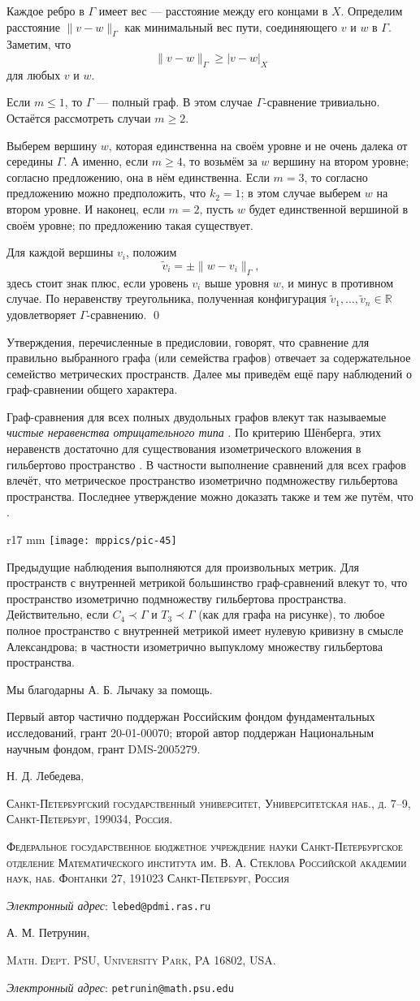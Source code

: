\documentclass{article}
\makeatletter
\newcommand{\Addresses}{{\bigskip\footnotesize

\noindent Н. Д. Лебедева,
\par\nopagebreak
 \textsc{Санкт-Петербургский государственный университет, Университетская наб., д. 7–9, Санкт-Петербург, 199034, Россия.}
\par
\nopagebreak
 \textsc{Федеральное  государственное  бюджетное  учреждение  науки
Санкт-Петербургское  отделение  Математического  института
им. В. А. Стеклова  Российской  академии  наук, наб. Фонтанки 27,
191023 Санкт-Петербург,
Россия }
  \par\nopagebreak
  \textit{Электронный адрес}: \texttt{lebed@pdmi.ras.ru}

\medskip

\noindent   А. М. Петрунин, 
\par\nopagebreak
 \textsc{Math. Dept. PSU, University Park, PA 16802, USA.}
  \par\nopagebreak
  \textit{Электронный адрес}: \texttt{petrunin@math.psu.edu}
  
}}
\def\parbf#1{\medskip\noindent{\bf #1}}
\def\qeds{\qed\par\medskip}
\makeatother
\begin{document}
Каждое ребро в $\Gamma$ имеет вес --- расстояние между его концами в $X$.
Определим расстояние $\|v-w\|_\Gamma$ как минимальный вес пути, соединяющего $v$ и $w$ в $\Gamma$.
Заметим, что 
\[\|v-w\|_\Gamma\geqslant |v-w|_X\]
для любых $v$ и $w$.

Если $m\leqslant 1$, то $\Gamma$ --- полный граф.
В этом случае $\Gamma$-сравнение тривиально.
Остаётся рассмотреть случаи $m\geqslant2$.

Выберем вершину $w$, которая единственна на своём уровне и не очень далека от середины $\Gamma$.
А именно, если $m\geqslant 4$, то возьмём за $w$ вершину на втором уровне; 
согласно предложению, она в нём единственна.
Если $m=3$, то согласно предложению можно предположить, что $k_2=1$;
в этом случае выберем $w$ на втором уровне.
И наконец, если $m=2$, пусть $w$ будет единственной вершиной в своём уровне;
по предложению такая существует.

Для каждой вершины $v_i$, положим
\[\tilde v_i=\pm \|w-v_i\|_\Gamma,\]
здесь стоит знак плюс, если уровень $v_i$ выше уровня $w$, и минус в противном случае.
По неравенству треугольника, полученная конфигурация $\tilde v_1,\dots,\tilde v_n\in\mathbb{R}$ удовлетворяет $\Gamma$-сравнению.
\qeds

\parbf{Замечания.}
Утверждения, перечисленные в предисловии, говорят, что сравнение для правильно выбранного графа (или семейства графов) отвечает за содержательное семейство метрических пространств.
Далее мы приведём ещё пару наблюдений о граф-сравнении общего характера.

Граф-сравнения для всех полных двудольных графов влекут так называемые \emph{чистые неравенства отрицательного типа} \cite[6.1.1]{deza-laurent-ru}.
По критерию Шёнберга, этих неравенств достаточно для существования изометрического вложения в гильбертово пространство \cite[6.2.1]{deza-laurent-ru}.
В частности выполнение сравнений для всех графов влечёт, что метрическое пространство изометрично подмножеству гильбертова пространства.
Последнее утверждение можно доказать также и тем же путём, что \cite[Prop. 1.9]{toyoda}.


\begin{wrapfigure}{r}{17 mm}
\vskip-6mm
\centering
\texttt{[image: mppics/pic-45]}
\vskip-2mm
\end{wrapfigure}

Предыдущие наблюдения выполняются для произвольных метрик.
Для пространств с внутренней метрикой большинство граф-сравнений влекут то, что пространство изометрично подмножеству гильбертова пространства.
Действительно, если $C_4\prec\Gamma$ и $T_3\prec\Gamma$ (как для графа на рисунке),
то любое полное пространство с внутренней метрикой имеет нулевую кривизну в смысле Александрова; 
в частности изометрично выпуклому множеству гильбертова пространства.

\parbf{Благодарности.}
Мы благодарны А. Б. Лычаку за помощь. 

Первый автор частично поддержан Российским фондом фундаментальных исследований, грант 20-01-00070;
второй автор поддержан Национальным научным фондом, грант DMS-2005279.

{\sloppy
\printbibliography[heading=bibintoc]
\fussy
}

\Addresses
\end{document}
